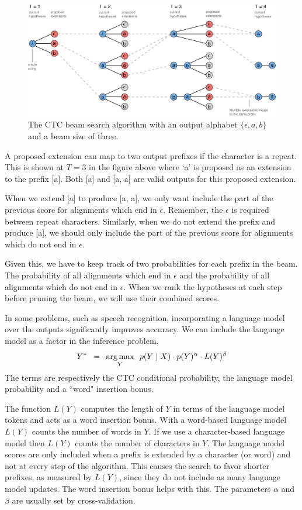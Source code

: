 \begin{figure}
\centering
\includegraphics[width=\textwidth]{background/figures/prefix_beam_search.pdf}
\caption{The CTC beam search algorithm with an output alphabet $\{\epsilon, a,
    b\}$ and a beam size of three.}
\end{figure}

A proposed extension can map to two output prefixes if the character is a
repeat. This is shown at $T=3$ in the figure above where `a’ is proposed as an
extension to the prefix [a]. Both [a] and [a, a] are valid outputs for this
proposed extension.

When we extend [a] to produce [a, a], we only want include the part of the
previous score for alignments which end in $\epsilon$. Remember, the $\epsilon$
is required between repeat characters. Similarly, when we do not extend the
prefix and produce [a], we should only include the part of the previous score
for alignments which do not end in $\epsilon$.

Given this, we have to keep track of two probabilities for each prefix in the
beam. The probability of all alignments which end in $\epsilon$ and the
probability of all alignments which do not end in $\epsilon$. When we rank the
hypotheses at each step before pruning the beam, we will use their combined
scores.

In some problems, such as speech recognition, incorporating a language model
over the outputs significantly improves accuracy. We can include the language
model as a factor in the inference problem.
\begin{align*}
Y^* \enspace = \enspace \operatorname*{arg\,max}_Y \enspace
        p(Y \mid X) \cdot p(Y)^\alpha \cdot L(Y)^\beta
\end{align*}
The terms are respectively the CTC conditional probability, the language model
probability and a ``word" insertion bonus.

The function $L(Y)$ computes the length of $Y$ in terms of the language model
tokens and acts as a word insertion bonus. With a word-based language model
$L(Y)$ counts the number of words in $Y$. If we use a character-based language
model then $L(Y)$ counts the number of characters in $Y$. The language model
scores are only included when a prefix is extended by a character (or word) and
not at every step of the algorithm. This causes the search to favor shorter
prefixes, as measured by $L(Y)$, since they do not include as many language
model updates. The word insertion bonus helps with this. The parameters
$\alpha$ and $\beta$ are usually set by cross-validation.

